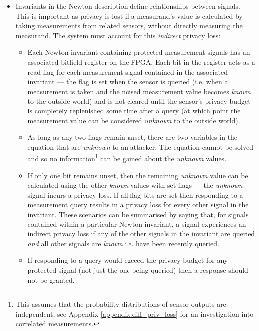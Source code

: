 \documentclass[12pt]{article}
\begin{document}
\begin{itemize}
      \item Invariants in the Newton description define relationships between signals. This is important as privacy is lost if a measurand's value is calculated by taking measurements from related sensors, without directly measuring the measurand. The system must account for this \textit{indirect} privacy loss:
      \begin{itemize}
        \item Each Newton invariant containing protected measurement signals has an associated bitfield register on the FPGA. Each bit in the register acts as a read flag for each measurement signal contained in the associated invariant --- the flag is set when the sensor is queried (i.e. when a measurement is taken and the noised measurement value becomes \textit{known} to the outside world) and is not cleared until the sensor's privacy budget is completely replenished some time after a query (at which point the measurement value can be considered \textit{unknown} to the outside world).
        \item As long as any two flags remain unset, there are two variables in the equation that are \textit{unknown} to an attacker. The equation cannot be solved and so no information\footnote{This assumes that the probability distributions of sensor outputs are independent, see Appendix \ref{appendix:diff_priv_loss} for an investigation into correlated measurements.} can be gained about the \textit{unknown} values.
        \item If only one bit remains unset, then the remaining \textit{unknown} value can be calculated using the other \textit{known} values with set flags --- the \textit{unknown} signal incurs a privacy loss. If all flag bits are set then responding to a measurement query results in a privacy loss for every other signal in the invariant. These scenarios can be summarised by saying that, for signals contained within a particular Newton invariant, a signal experiences an indirect privacy loss if any of the other signals in the invariant are queried \textit{and} all other signals are \textit{known} i.e. have been recently queried.
        \item If responding to a query would exceed the privacy budget for any protected signal (not just the one being queried) then a response should not be granted.
      \end{itemize}

    \end{itemize}
\end{document}
